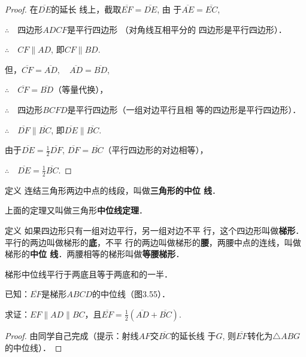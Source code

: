 \begin{proof}
 在$\overline{DE}$的延长
线上，截取$\overline{EF}=\overline{DE}$, 由
于$\overline{AE}=\overline{EC}$, 

$\therefore\quad $四边形$ADCF$是平行四边形
（对角线互相平分的
四边形是平行四边形）．

$\therefore\quad CF\parallel AD$, 即$CF\parallel BD$.

但，$\overline{CF}=\overline{AD},\quad \overline{AD}=\overline{BD}$,

$\therefore\quad \overline{CF}=\overline{BD}$（等量代换），

$\therefore\quad $四边形$BCFD$是平行四边形（一组对边平行且相
等的四边形是平行四边形）．

$\therefore\quad \overline{DF}\parallel \overline{BC}$, 即$\overline{DE}\parallel \overline{BC}$.

由于$\overline{DE}=\frac{1}{2}\overline{DF}$, $\overline{DF}=\overline{BC}$（平行四边形的对边相等），

$\therefore\quad \overline{DE}=\frac{1}{2}\overline{BC}$.
\end{proof}

\begin{blk}
    {定义}
连结三角形两边中点的线段，叫做\textbf{三角形的中位
线}．
\end{blk}

上面的定理又叫做三角形\textbf{中位线定理}．

\begin{blk}
    {定义} 如果四边形只有一组对边平行，另一组对边不平
行，这个四边形叫做\textbf{梯形}．平行的两边叫做梯形的\textbf{底}，不平
行的两边叫做梯形的\textbf{腰}，两腰中点的连线，叫做梯形的\textbf{中位
线}．两腰相等的梯形叫做\textbf{等腰梯形}．
\end{blk}

\begin{example}
    梯形中位线平行于两底且等于两底和的一半．
\end{example}

已知：$\overline{EF}$是梯形$ABCD$的中位线（图3.55）．

求证：$EF\parallel AD\parallel BC$，且$\overline{EF}=\frac{1}{2}(\overline{AD}+\overline{BC})$.

\begin{proof}
由同学自己完成（提示：射线$AF$交$\overline{BC}$的延长线
    于$G$, 则$\overline{EF}$转化为$\triangle ABG$的中位线）．
\end{proof}

